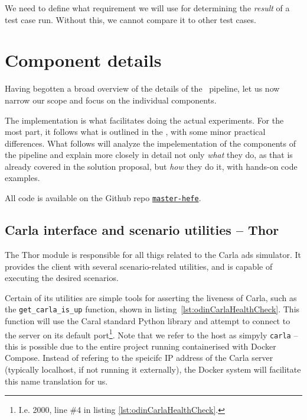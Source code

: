 We need to define what requirement we will use for determining the \textit{result} of a test case
run. Without this, we cannot compare it to other test cases.

\section{Component details}

Having begotten a broad overview of the details of the \hefe~pipeline, let us now narrow our scope
and focus on the individual components.



The implementation is what facilitates doing the actual experiments. For the
most part, it follows what is outlined in the , with
some minor practical differences.
What follows will analyze the impelementation of the components of the \hefe{}
pipeline and explain more closely in detail not only \emph{what} they do, as
that is already covered in the solution proposal, but \emph{how} they do it, with
hands-on code examples.

All code is available on the Github repo \href{https://github.com/orjahren/master-hefe}{\texttt{master-hefe}}.

\subsection{Carla interface and scenario utilities -- Thor}

The Thor module is responsible for all thigs related to the Carla \acrshort{ads}
simulator. It provides the client with several scenario-related utilities, and
is capable of executing the desired scenarios.


Certain of its utilities are simple tools for asserting the liveness of Carla,
such as the \texttt{get\_carla\_is\_up} function, shown in
listing~\ref{lst:odinCarlaHealthCheck}. This function will use the Caral
standard Python library and attempt to connect to the server on its default
port\footnote{I.e. \num{2000}, line \#4 in listing
    \ref{lst:odinCarlaHealthCheck}.}. Note that we refer to the host as simpyly
\texttt{carla} -- this is possible due to the entire project running
containerised with Docker Compose. Instead of refering to the speicifc IP
address of the Carla server (typically localhost, if not running it externally),
the Docker system will facilitate this name translation for us.


